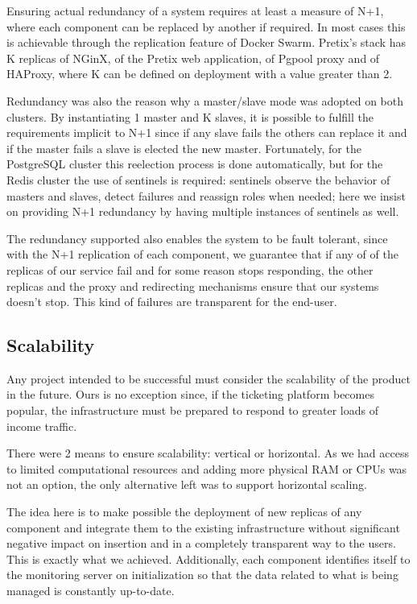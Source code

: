 \documentclass[12pt]{article}
\begin{document}
Ensuring actual redundancy of a system requires at least a measure of N+1, where each component can be replaced by another if required.
In most cases this is achievable through the replication feature of Docker Swarm.
Pretix's stack has K replicas of NGinX, of the Pretix web application, of Pgpool proxy and of HAProxy, where K can be defined on deployment with a value greater than 2.

Redundancy was also the reason why a master/slave mode was adopted on both clusters.
By instantiating 1 master and K slaves, it is possible to fulfill the requirements implicit to N+1 since if any slave fails the others can replace it and if the
master fails a slave is elected the new master.
Fortunately, for the PostgreSQL cluster this reelection process is done automatically, but for the Redis cluster the use of sentinels is required: sentinels
observe the behavior of masters and slaves, detect failures and reassign roles when needed; here we insist on providing N+1 redundancy by having multiple
instances of sentinels as well.

The redundancy supported also enables the system to be fault tolerant, since with the N+1 replication of each component, we guarantee that if any of of the replicas of our service fail and for some reason stops responding, the other replicas and the proxy and redirecting mechanisms ensure that our systems doesn't stop. This kind of failures are transparent for the end-user.

\subsection{Scalability} \label{architecture.scalability} %


Any project intended to be successful must consider the scalability of the product in the future.
Ours is no exception since, if the ticketing platform becomes popular, the infrastructure must be prepared to respond to greater loads of income traffic.

There were 2 means to ensure scalability: vertical or horizontal.
As we had access to limited computational resources and adding more physical RAM or CPUs was not an option, the only alternative left was to support horizontal scaling.

The idea here is to make possible the deployment of new replicas of any component and integrate them to the existing infrastructure without significant negative
impact on insertion and in a completely transparent way to the users.
This is exactly what we achieved.
Additionally, each component identifies itself to the monitoring server on initialization so that the data related to what is being managed is constantly up-to-date.
\end{document}
